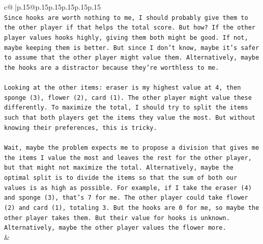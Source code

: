 \documentclass{article}
\begin{document}
{\begin{supertabular}{c@{$\;$}|p{.15\linewidth}@{}p{.15\linewidth}p{.15\linewidth}p{.15\linewidth}p{.15\linewidth}p{.15\linewidth}}
{{{\\ 
\texttt{Since hooks are worth nothing to me, I should probably give them to the other player if that helps the total score. But how? If the other player values hooks highly, giving them both might be good. If not, maybe keeping them is better. But since I don't know, maybe it's safer to assume that the other player might value them. Alternatively, maybe the hooks are a distractor because they're worthless to me.} \\
\\ 
\texttt{Looking at the other items: eraser is my highest value at 4, then sponge (3), flower (2), card (1). The other player might value these differently. To maximize the total, I should try to split the items such that both players get the items they value the most. But without knowing their preferences, this is tricky.} \\
\\ 
\texttt{Wait, maybe the problem expects me to propose a division that gives me the items I value the most and leaves the rest for the other player, but that might not maximize the total. Alternatively, maybe the optimal split is to divide the items so that the sum of both our values is as high as possible. For example, if I take the eraser (4) and sponge (3), that's 7 for me. The other player could take flower (2) and card (1), totaling 3. But the hooks are 0 for me, so maybe the other player takes them. But their value for hooks is unknown. Alternatively, maybe the other player values the flower more.} \\
            }
        }
    }
    & \\ \\


\end{supertabular}}
\end{document}
